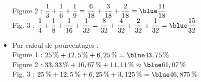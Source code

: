 \begin{itemize}
         Figure 2 : $\dfrac13+\dfrac16+\dfrac19 =\dfrac{6}{18}+\dfrac{3}{18}+\dfrac{2}{18} =\blue \dfrac{11}{18}$ \\ [1mm]
         Fig. 3 : $\dfrac14+\dfrac18+\dfrac{1}{16}+\dfrac{1}{32} =\dfrac{8}{32}+\dfrac{4}{32}+\dfrac{2}{32}+\dfrac{1}{32} =\blue \dfrac{15}{32}$ \\
      \item Par calcul de pourcentages : \\ [1mm]
         Figure 1 : $25\,\%+12,5\,\%+6,25\,\% =\blue 43,75\,\%$ \\ [1mm]
         Figure 2 : $33,33\,\%+16,67\,\%+11,11\,\% \approx \blue 61,07\,\%$ \\ [1mm]
         Fig. 3 : $25\,\%+12,5\,\%+6,25\,\%+3,125\,\% =\blue 46,875\,\%$
   \end{itemize}
